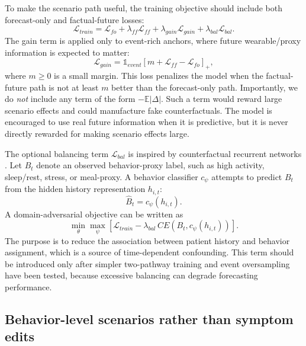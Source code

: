 To make the scenario path useful, the training objective should include both forecast-only and factual-future losses:
\begin{equation}
    \mathcal{L}_{train}
    = \mathcal{L}_{fo}
    + \lambda_{ff}\mathcal{L}_{ff}
    + \lambda_{gain}\mathcal{L}_{gain}
    + \lambda_{bal}\mathcal{L}_{bal}.
    \label{eq:scenario_train_loss}
\end{equation}
The gain term is applied only to event-rich anchors, where future wearable/proxy information is expected to matter:
\begin{equation}
    \mathcal{L}_{gain}
    = \mathbb{1}_{event}
    \left[m + \mathcal{L}_{ff} - \mathcal{L}_{fo}\right]_+,
    \label{eq:gain_hinge}
\end{equation}
where $m \geq 0$ is a small margin. This loss penalizes the model when the factual-future path is not at least $m$ better than the forecast-only path. Importantly, we do \emph{not} include any term of the form $-\mathbb{E}|\Delta|$. Such a term would reward large scenario effects and could manufacture fake counterfactuals. The model is encouraged to use real future information when it is predictive, but it is never directly rewarded for making scenario effects large.

The optional balancing term $\mathcal{L}_{bal}$ is inspired by counterfactual recurrent networks \citep{bica2020crn}. Let $B_t$ denote an observed behavior-proxy label, such as high activity, sleep/rest, stress, or meal-proxy. A behavior classifier $c_\psi$ attempts to predict $B_t$ from the hidden history representation $h_{i,t}$:
\begin{equation}
    \hat{B}_t = c_\psi(h_{i,t}).
\end{equation}
A domain-adversarial objective can be written as
\begin{equation}
    \min_\theta \max_\psi
    \left[\mathcal{L}_{train} - \lambda_{bal}\, CE(B_t,c_\psi(h_{i,t}))\right].
    \label{eq:adversarial_balancing}
\end{equation}
The purpose is to reduce the association between patient history and behavior assignment, which is a source of time-dependent confounding. This term should be introduced only after simpler two-pathway training and event oversampling have been tested, because excessive balancing can degrade forecasting performance.

\subsection{Behavior-level scenarios rather than symptom edits}
\label{subsec:behavior_level_scenarios}

